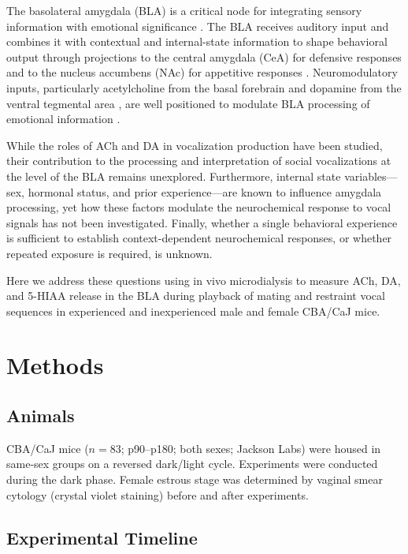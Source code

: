 \documentclass[11pt]{article}
\begin{document}
The basolateral amygdala (BLA) is a critical node for integrating sensory information with emotional significance \citep{ledoux2000emotion, janak2015amygdala}. The BLA receives auditory input and combines it with contextual and internal-state information to shape behavioral output through projections to the central amygdala (CeA) for defensive responses and to the nucleus accumbens (NAc) for appetitive responses \citep{beyeler2016divergent, tye2013amygdala}. Neuromodulatory inputs, particularly acetylcholine from the basal forebrain \citep{ballinger2016basal, hasselmo2006role} and dopamine from the ventral tegmental area \citep{schultz2007multiple}, are well positioned to modulate BLA processing of emotional information \citep{mcgaugh2004amygdala}.

While the roles of ACh and DA in vocalization production have been studied, their contribution to the processing and interpretation of social vocalizations at the level of the BLA remains unexplored. Furthermore, internal state variables---sex, hormonal status, and prior experience---are known to influence amygdala processing, yet how these factors modulate the neurochemical response to vocal signals has not been investigated. Finally, whether a single behavioral experience is sufficient to establish context-dependent neurochemical responses, or whether repeated exposure is required, is unknown.

Here we address these questions using in vivo microdialysis to measure ACh, DA, and 5-HIAA release in the BLA during playback of mating and restraint vocal sequences in experienced and inexperienced male and female CBA/CaJ mice.

\section{Methods}

\subsection{Animals}

CBA/CaJ mice ($n = 83$; p90--p180; both sexes; Jackson Labs) were housed in same-sex groups on a reversed dark/light cycle. Experiments were conducted during the dark phase. Female estrous stage was determined by vaginal smear cytology (crystal violet staining) before and after experiments.

\subsection{Experimental Timeline}
\end{document}
